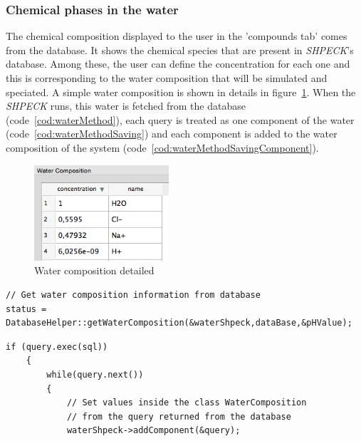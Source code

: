 \subsubsection{Chemical phases in the water}
The chemical composition displayed to the user in the 'compounds tab' comes from the database. It shows the chemical species that are present in \emph{SHPECK}'s database. Among these, the user can define the concentration for each one and this is corresponding to the water composition that will be simulated and speciated. A simple water composition is shown in details in figure~\ref{fig:waterCompositionDetail}. When the \emph{SHPECK} runs, this water is fetched from the database (code~\ref{cod:waterMethod}), each query is treated as one component of the water (code~\ref{cod:waterMethodSaving}) and each component is added to the water composition of the system (code~\ref{cod:waterMethodSavingComponent}).

\begin{figure}[ht!]
\centering
\includegraphics[width=50mm]{figures/shpeck-waterComposition.png}
\caption{Water composition detailed}
\label{fig:waterCompositionDetail}
\end{figure}

\begin{minipage}{0.8\linewidth}
\begin{lstlisting}[frame=single, label=cod:waterMethod, caption=Fetching the water composition from the database method]
// Get water composition information from database
status = DatabaseHelper::getWaterComposition(&waterShpeck,dataBase,&pHValue);
\end{lstlisting}
\end{minipage}

\begin{minipage}{0.8\linewidth}
\begin{lstlisting}[frame=single, label=cod:waterMethodSaving, caption=Excerpt of the water composition saving code]
    if (query.exec(sql))
    {
        while(query.next())
        {
            // Set values inside the class WaterComposition
            // from the query returned from the database
            waterShpeck->addComponent(&query);
\end{lstlisting}
\end{minipage}

